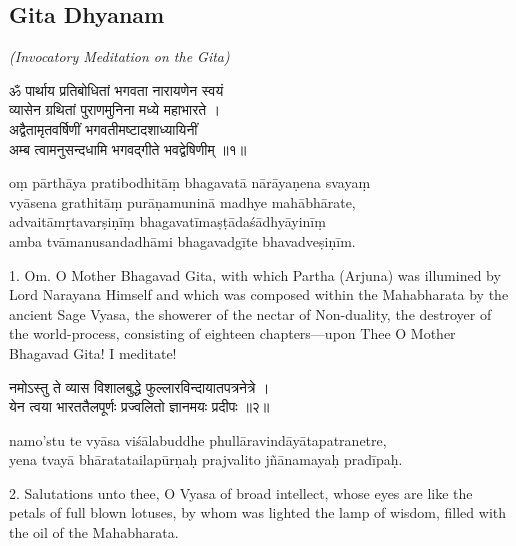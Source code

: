 \chapterdrop

\begin{center}
\section{\large \textbf{Gita Dhyanam}}

\headerspace
\textit{(Invocatory Meditation on the Gita)}

\headerspace
\end{center}

\begin{gitaverse}
ॐ पार्थाय प्रतिबोधितां भगवता नारायणेन स्वयं \\
\tab व्यासेन ग्रथितां पुराणमुनिना मध्ये महाभारते । \\
अद्वैतामृतवर्षिणीं भगवतीमष्टादशाध्यायिनीं \\
\tab अम्ब त्वामनुसन्दधामि भगवद्गीते भवद्वेषिणीम् ॥१॥
\end{gitaverse}

\begin{transliteration}
oṃ pārthāya pratibodhitāṃ bhagavatā nārāyaṇena svayaṃ \\
\tab vyāsena grathitāṃ purāṇamuninā madhye mahābhārate, \\
advaitāmṛtavarṣiṇīṃ bhagavatīmaṣṭādaśādhyāyinīṃ \\
\tab amba tvāmanusandadhāmi bhagavadgīte bhavadveṣiṇīm.
\end{transliteration}

1. Om. O Mother Bhagavad Gita, with which Partha (Arjuna) was illumined by Lord
Narayana Himself and which was composed within the Mahabharata by the ancient
Sage Vyasa, the showerer of the nectar of Non-duality, the destroyer of the
world-process, consisting of eighteen chapters---upon Thee O Mother Bhagavad
Gita! I meditate!

\begin{gitaverse}
नमोऽस्तु ते व्यास विशालबुद्धे फुल्लारविन्दायातपत्रनेत्रे । \\
येन त्वया भारततैलपूर्णः प्रज्वलितो ज्ञानमयः प्रदीपः ॥२॥
\end{gitaverse}

\begin{transliteration}
namo'stu te vyāsa viśālabuddhe phullāravindāyātapatranetre, \\
yena tvayā bhāratatailapūrṇaḥ prajvalito jñānamayaḥ pradīpaḥ.
\end{transliteration}

2. Salutations unto thee, O Vyasa of broad intellect, whose eyes are like the
petals of full blown lotuses, by whom was lighted the lamp of wisdom, filled
with the oil of the Mahabharata.

